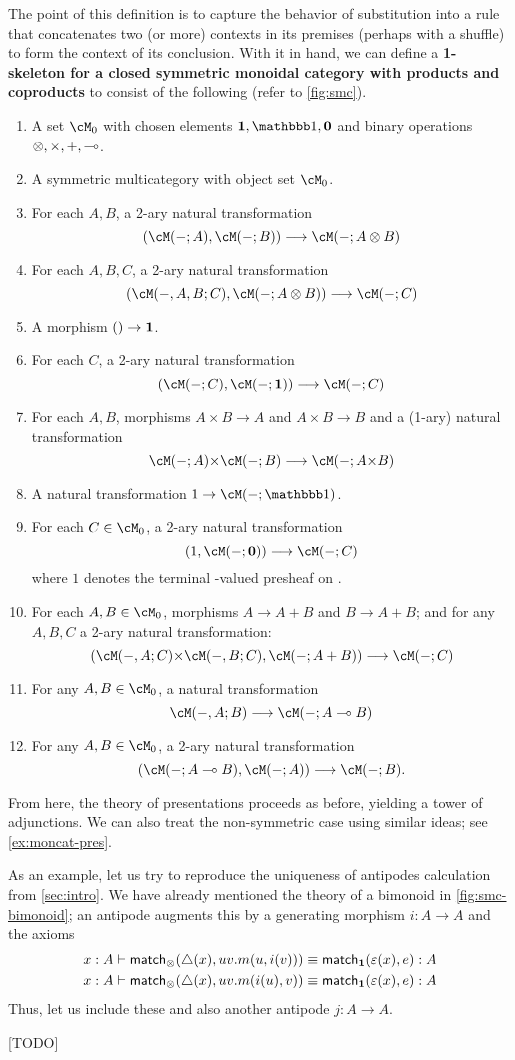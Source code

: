 The point of this definition is to capture the behavior of substitution into a rule that concatenates two (or more) contexts in its premises (perhaps with a shuffle) to form the context of its conclusion.
With it in hand, we can define a \textbf{1-skeleton for a closed symmetric monoidal category with products and coproducts} to consist of the following (refer to \cref{fig:smc}).
\begin{enumerate}
\item A set $\cM_0$ with chosen elements $\one,\unit,\zero$ and binary operations $\tensor,\times,+,\hom$.
\item A symmetric multicategory \cM with object set $\cM_0$.
\item For each $A,B$, a 2-ary natural transformation
  \[ (\cM(-;A),\cM(-;B)) \too \cM(-;A\tensor B) \]
\item For each $A,B,C$, a 2-ary natural transformation
  \[ (\cM(-,A,B;C),\cM(-;A\tensor B)) \too \cM(-;C) \]
\item A morphism $()\to \mathbf{1}$.
\item For each $C$, a 2-ary natural transformation
  \[ (\cM(-;C),\cM(-;\one)) \too \cM(-;C) \]
\item For each $A,B$, morphisms $A\times B\to A$ and $A\times B\to B$ and a (1-ary) natural transformation
  \[ \cM(-;A) \times \cM(-;B) \too \cM(-;A\times B) \]
\item A natural transformation $1\to \cM(-;\unit)$.
\item For each $C\in\cM_0$, a 2-ary natural transformation
  \[ (1,\cM(-;\zero)) \too \cM(-;C) \]
  where $1$ denotes the terminal \bSet-valued presheaf on \cM.
\item For each $A,B\in\cM_0$, morphisms $A\to A+B$ and $B\to A+B$; and for any $A,B,C$ a 2-ary natural transformation:
  \[ (\cM(-,A;C) \times \cM(-,B;C) , \cM(-;A+B)) \too \cM(-;C) \]
\item For any $A,B\in \cM_0$, a natural transformation
  \[ \cM(-,A;B) \too \cM(-;A\hom B) \]
\item For any $A,B\in \cM_0$, a 2-ary natural transformation
  \[ (\cM(-;A\hom B),\cM(-;A)) \too \cM(-;B). \]
\end{enumerate}

From here, the theory of presentations proceeds as before, yielding a tower of adjunctions.
We can also treat the non-symmetric case using similar ideas; see \cref{ex:moncat-pres}.

\begin{props}
As an example, let us try to reproduce the uniqueness of antipodes calculation from \cref{sec:intro}.
We have already mentioned the theory of a bimonoid in \ref{fig:smc-bimonoid}; an antipode augments this by a generating morphism $i:A\to A$ and the axioms
\begin{align*}
  x:A &\vdash \mathsf{match}_\otimes(\triangle(x),uv.m(u,i(v))) \equiv \mathsf{match}_{\mathbf{1}}(\varepsilon(x),e) :A\\
  x:A &\vdash \mathsf{match}_\otimes(\triangle(x),uv.m(i(u),v)) \equiv \mathsf{match}_{\mathbf{1}}(\varepsilon(x),e) :A
\end{align*}
Thus, let us include these and also another antipode $j:A\to A$.

[TODO]
\end{props}


